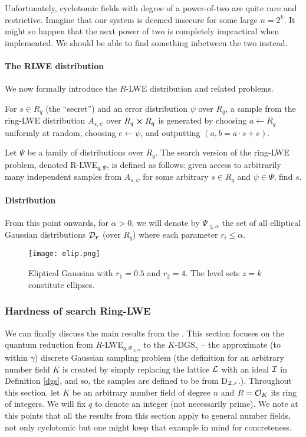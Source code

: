 Unfortunately, cyclotomic fields with degree of a power-of-two are quite rare and restrictive. Imagine that our system is deemed insecure for some large $n = 2^k$. It might so happen that the next power of two is completely impractical when implemented. We should be able to find something inbetween the two instead.
\paragraph{The RLWE distribution}
We now formally introduce the $R$-LWE distribution and related problems.
\begin{definition}
	For $s \in R_q$ (the ``secret'') and an error distribution $\psi$ over $R_q$, a sample from the ring-LWE distribution $A_{s, \psi}$ over $R_q \cross R_q$ is generated by choosing $a \leftarrow R_q$ uniformly at random, choosing $e \leftarrow \psi$, and outputting $(a, b = a \cdot s + e)$.
\end{definition}
\begin{definition}
	Let $\Psi$ be a family of distributions over $R_q$. The search version of the ring-LWE problem, denoted R-LWE$_{q, \Psi}$, is defined as follows: given access to arbitrarily many independent samples from $A_{s, \psi}$ for some arbitrary $s \in R_q$ and $\psi \in \Psi$, find $s$.
\end{definition}
\paragraph{Distribution}
From this point onwards, for $\alpha > 0$, we will denote by $\Psi_{\leq \alpha}$ the set of all elliptical Gaussian distributions $\mathcal{D}_{\boldsymbol{r}}$ (over $R_q$) where each parameter $r_i \leq \alpha$.
\begin{figure}[ht]
	\centering
	\texttt{[image: elip.png]}
	\caption{Eliptical Gaussian with $r_1 = 0.5$ and $r_2 = 4$. The level sets $z=k$ constitute ellipses.}
	\label{elip-gauss}
\end{figure}
\subsubsection{Hardness of search Ring-LWE}\label{h-rlwe}
We can finally discuss the main results from the \cite{ring-lwe}. This section focuses on the quantum reduction from $R$-LWE$_{q, \Psi_{\leq \alpha}}$ to the $K$-DGS$_{\gamma}$ -- the approximate (to within $\gamma$) discrete Gaussian sampling problem (the definition for an arbitrary number field $K$ is created by simply replacing the lattice $\mathcal{L}$ with an ideal $\mathcal{I}$ in Definition \ref{dgs}, and so, the samples are defined to be from D$_{\mathcal{I}, r}$.). Throughout this section, let $K$ be an arbitrary number field of degree $n$ and $R = \mathcal{O}_K$ its ring of integers. We will fix $q$ to denote an integer (not necessarily prime). We note at this points that all the results from this section apply to general number fields, not only cyclotomic but one might keep that example in mind for concreteness.

